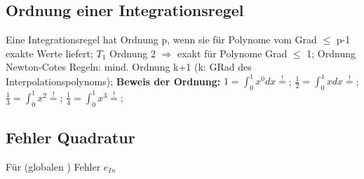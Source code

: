 \subsection{Ordnung einer Integrationsregel}
Eine Integrationsregel hat Ordnung p, wenn sie für Polynome vom Grad $\le$ p-1 exakte Werte liefert; $ T_{1} $ Ordnung 2 $\Rightarrow$ exakt für Polynome Grad $\le$ 1; 
Ordnung Newton-Cotes Regeln: mind. Ordnung k+1 (k: GRad des Interpolationspolynoms);
\textbf{Beweis der Ordnung:}
$ 1 = \int_{0}^{1} x^{0} dx \overset{!}{=} $; 
$ \frac{1}{2} = \int_{0}^{1} x dx \overset{!}{=} $; 
$ \frac{1}{3} = \int_{0}^{1} x^{2} \overset{!}{=} $; 
$ \frac{1}{4} = \int_{0}^{1} x^{3} \overset{!}{=} $; 
\subsection{Fehler Quadratur}
Für (globalen ) Fehler $ e_{In}$


